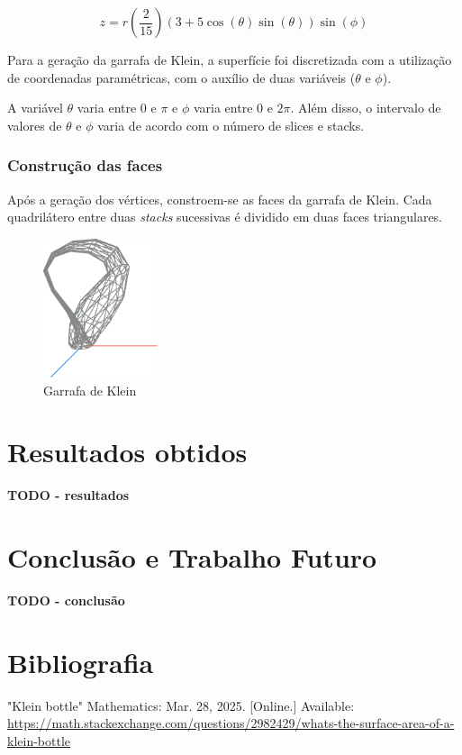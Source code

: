 \documentclass[12pt, a4paper]{article}
\begin{document}
$$
z = r \left( \frac{2}{15} \right) (3 + 5 \cos(\theta) \sin(\theta)) \sin(\phi)
$$

Para a geração da garrafa de Klein, a superfície foi discretizada com a utilização de coordenadas
paramétricas, com o auxílio de duas variáveis ($\theta$ e $\phi$).

A variável $\theta$ varia entre $0$ e $\pi$ e $\phi$ varia entre $0$ e $2\pi$. Além disso, o
intervalo de valores de $\theta$ e $\phi$ varia de acordo com o número de slices e stacks.

\subsubsection{Construção das faces}

Após a geração dos vértices, constroem-se as faces da garrafa de Klein. Cada quadrilátero entre duas
\emph{stacks} sucessivas é dividido em duas faces triangulares.

\begin{figure}[H]
    \centering
    \includegraphics[width=0.3\textwidth]{res/phase2/figures/kleinBottle.pdf}
    \caption{Garrafa de Klein}
\end{figure}

\section{Resultados obtidos}

\textbf{\color{red} TODO - resultados}

\section{Conclusão e Trabalho Futuro}

\textbf{\color{red} TODO - conclusão}

\begingroup
\section{Bibliografia}
\renewcommand{\section}[2]{}

\begin{thebibliography}{9}
        "Klein bottle"{} Mathematics: Mar. 28, 2025. [Online.] Available:
     \url{https://math.stackexchange.com/questions/2982429/whats-the-surface-area-of-a-klein-bottle}
\end{thebibliography}
\endgroup
\end{document}

